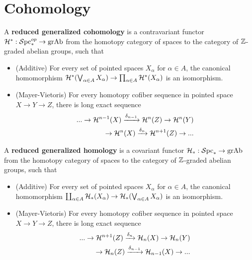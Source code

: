 \section{Cohomology}\label{sec:preliminary-cohomology}
\begin{definition}
\cite{PreRudyak}
    A \textbf{reduced generalized cohomology} is a contravariant functor $\mathcal{H}^*: \operatorname{\mathcal{S}pc}_*^{op}\to \mathrm{grAb}$ from the homotopy category of spaces to the category of $\mathbb{Z}$-graded abelian groups, such that 
    \begin{itemize}
        \item (Additive) For every set of pointed spaces $X_\alpha$ for $\alpha \in A$, the canonical homomorphism $\mathcal{H}^*(\bigvee_{\alpha \in A}X_\alpha)\to \prod_{\alpha \in A} \mathcal{H}^*(X_\alpha)$ is an isomorphism.
        \item (Mayer-Vietoris) For every homotopy cofiber sequence in pointed space $X\to Y\to Z$, there is long exact sequence
        \begin{align*}
        ...\to \mathcal{H}^{n-1}(X)\xrightarrow{\delta_{n-1}} \mathcal{H}^n(Z)\to \mathcal{H}^n(Y) 
        \\ \to \mathcal{H}^n(X)\xrightarrow{\delta_n} \mathcal{H}^{n+1}(Z)\to ...
        \end{align*}
    \end{itemize}

    A \textbf{reduced generalized homology} is a covariant functor $\mathcal{H}_*: \operatorname{\mathcal{S}pc}_*\to \mathrm{grAb}$ from the homotopy category of spaces to the category of $\mathbb{Z}$-graded abelian groups, such that 
     \begin{itemize}
        \item (Additive) For every set of pointed spaces $X_\alpha$ for $\alpha \in A$, the canonical homomorphism $\coprod_{\alpha \in A} \mathcal{H}_*(X_\alpha)\to \mathcal{H}_*(\bigvee_{\alpha \in A}X_\alpha)$ is an isomorphism.
        \item (Mayer-Vietoris) For every homotopy cofiber sequence in pointed space $X\to Y\to Z$, there is long exact sequence
        \begin{align*}
        ...\to \mathcal{H}^{n+1}(Z)\xrightarrow{\delta_{n}} \mathcal{H}_n(X)\to \mathcal{H}_n(Y) 
        \\ \to \mathcal{H}_n(Z)\xrightarrow{\delta_{n-1}} \mathcal{H}_{n-1}(X)\to ...
        \end{align*}
    \end{itemize}

\end{definition}

